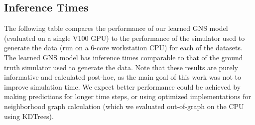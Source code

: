 \documentclass{article}
\begin{document}
\subsection{Inference Times}

The following table compares the performance of our learned GNS model (evaluated on a single V100 GPU) to the performance of the simulator used to generate the data (run on a 6-core workstation CPU) for each of the datasets. The learned GNS model has inference times comparable to that of the ground truth simulator used to generate the data. Note that these results are purely informative and calculated post-hoc, as the main goal of this work was not to improve simulation time. We expect better performance could be achieved by making predictions for longer time steps, or using optimized implementations for neighborhood graph calculation (which we evaluated out-of-graph on the CPU using KDTrees).
\end{document}
